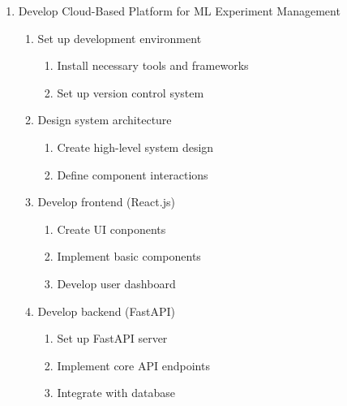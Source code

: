 \documentclass[12pt]{article}
\begin{document}
\begin{enumerate}
    \item Develop Cloud-Based Platform for ML Experiment Management
    \begin{enumerate}
        \item Set up development environment
        \begin{enumerate}
            \item Install necessary tools and frameworks
            \item Set up version control system
        \end{enumerate}
        \item Design system architecture
        \begin{enumerate}
            \item Create high-level system design
            \item Define component interactions
        \end{enumerate}
        \item Develop frontend (React.js)
        \begin{enumerate}
            \item Create UI conponents
            \item Implement basic components
            \item Develop user dashboard
        \end{enumerate}
        \item Develop backend (FastAPI)
        \begin{enumerate}
            \item Set up FastAPI server
            \item Implement core API endpoints
            \item Integrate with database
        \end{enumerate}
    \end{enumerate}


\end{enumerate}
\end{document}
